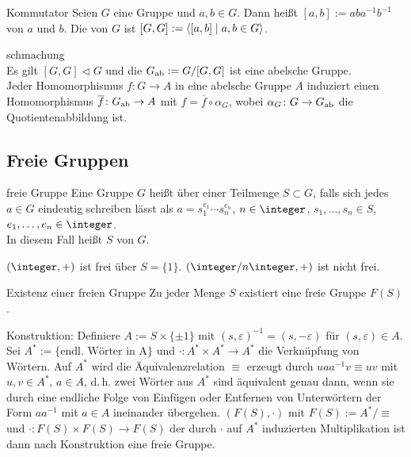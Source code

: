 \linie

\begin{Def}{Kommutator}
    Seien $G$ eine Gruppe und $a, b \in G$.
    Dann heißt $[a, b] := aba^{-1}b^{-1}$  von $a$ und $b$.
    Die  von $G$ ist
    $[G, G] := \left\langle{[a, b] \;|\; a, b \in G}\right\rangle$.
\end{Def}

\begin{Satz}{schmachung}\\
    Es gilt $[G, G] \vartriangleleft G$ und
    die  $G_{\text{ab}} := G/[G, G]$ ist eine
    abelsche Gruppe. \\
    Jeder Homomorphismus $f\colon G \rightarrow A$ in eine
    abelsche Gruppe $A$ induziert einen Homomorphismus
    $\overline{f}\colon G_{\text{ab}} \rightarrow A$ mit
    $f = \overline{f} \circ \alpha_G$, wobei
    $\alpha_G\colon G \rightarrow G_{\text{ab}}$ die Quotientenabbildung ist.
\end{Satz}

\subsection{%
    Freie Gruppen%
}

\begin{Def}{freie Gruppe}
    Eine Gruppe $G$ heißt  über einer Teilmenge $S \subset G$,
    falls sich jedes $a \in G$ eindeutig schreiben lässt als
    $a = s_1^{e_1} \dotsm s_n^{e_n}$, $n \in \integer$,
    $s_1, \dotsc, s_n \in S$, $e_1, \dotsc, e_n \in \integer$. \\
    In diesem Fall heißt $S$  von $G$.
\end{Def}

\begin{Bsp}
    $(\integer, +)$ ist frei über $S = \{1\}$.
    $(\integer/n\integer, +)$ ist nicht frei.
\end{Bsp}

\begin{Satz}{Existenz einer freien Gruppe}
    Zu jeder Menge $S$ existiert eine freie Gruppe $F(S)$.
\end{Satz}

\begin{Bem}
    Konstruktion:
    Definiere $A := S \times \{\pm 1\}$ mit
    $(s, \varepsilon)^{-1} = (s, -\varepsilon)$ für $(s, \varepsilon) \in A$.
    Sei $A^\ast := \{\text{endl. Wörter in A}\}$ und
    $\cdot\colon A^\ast \times A^\ast \rightarrow A^\ast$ die Verknüpfung
    von Wörtern.
    Auf $A^\ast$ wird die Äquivalenzrelation $\equiv$ erzeugt durch
    $uaa^{-1}v \equiv uv$ mit $u, v \in A^\ast$, $a \in A$, d.\,h. zwei
    Wörter aus $A^\ast$ sind äquivalent genau dann, wenn sie durch eine
    endliche Folge von Einfügen oder Entfernen von Unterwörtern der Form
    $aa^{-1}$ mit $a \in A$ ineinander übergehen.
    $(F(S), \cdot)$ mit $F(S) := A^\ast/\equiv$ und
    $\cdot\colon F(S) \times F(S) \rightarrow F(S)$
    der durch $\cdot$ auf $A^\ast$ induzierten Multiplikation ist dann
    nach Konstruktion eine freie Gruppe.
\end{Bem}

